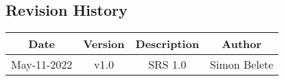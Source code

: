 


\begin{center}
\section*{Revision History}
\end{center}


\doublespacing
\vspace{1.0cm}
\noindent

\begin{center}
\begin{tabular}{ |c|c|c|c| } 
 \hline
 \textbf{Date} & \textbf{Version} & \textbf{Description} & \textbf{Author} \\ 
 \hline
 May-11-2022 & v1.0 & SRS 1.0 & Simon Belete \\
 \hline
\end{tabular}
\end{center}
